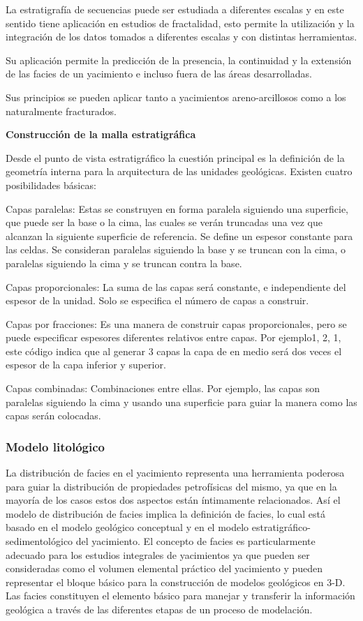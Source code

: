 La estratigraf\'ia de secuencias puede ser estudiada a diferentes escalas y en este sentido tiene aplicaci\'on en estudios de fractalidad, esto permite la utilizaci\'on y la integraci\'on de los datos tomados a diferentes escalas y con distintas herramientas.

Su aplicaci\'on permite la predicci\'on de la presencia, la continuidad y la extensi\'on de las facies de un yacimiento e incluso fuera de las \'areas desarrolladas.

Sus principios se pueden aplicar tanto a yacimientos areno-arcillosos como a los naturalmente fracturados.

\textbf{Construcci\'on de la malla estratigr\'afica}

Desde el punto de vista estratigr\'afico la cuesti\'on principal es la definici\'on de la geometr\'ia interna para la arquitectura de las unidades geol\'ogicas. Existen cuatro posibilidades b\'asicas:

Capas paralelas: Estas se construyen en forma paralela siguiendo una superficie, que puede ser la base o la cima, las cuales se ver\'an truncadas una vez que alcanzan la siguiente superficie de referencia. Se define un espesor constante para las celdas. Se consideran paralelas siguiendo la base y se truncan con la cima, o paralelas siguiendo la cima y se truncan contra la base.

Capas proporcionales: La suma de las capas ser\'a constante, e independiente del espesor de la unidad. Solo se especifica el n\'umero de capas a construir.

Capas por fracciones: Es una manera de construir capas proporcionales, pero se puede especificar espesores diferentes relativos entre capas. Por ejemplo1, 2, 1, este c\'odigo indica que al generar 3 capas la capa de en medio ser\'a dos veces el espesor de la capa inferior y superior.

Capas combinadas: Combinaciones entre ellas. Por ejemplo, las capas son paralelas siguiendo la cima y usando una superficie para guiar la manera como las capas ser\'an colocadas.

\subsubsection{Modelo litol\'ogico}

La distribuci\'on de facies en el yacimiento representa una herramienta poderosa para guiar la distribuci\'on de propiedades petrof\'isicas del mismo, ya que en la mayor\'ia de los casos estos dos aspectos est\'an \'intimamente relacionados. As\'i el modelo de distribuci\'on de facies implica la definici\'on de facies, lo cual est\'a basado en el modelo geol\'ogico conceptual y en el modelo estratigr\'afico-sedimentol\'ogico del yacimiento. El concepto de facies es particularmente adecuado para los estudios integrales de yacimientos ya que pueden ser consideradas como el volumen elemental pr\'actico del yacimiento y pueden representar el bloque b\'asico para la construcci\'on de modelos geol\'ogicos en 3-D. Las facies constituyen el elemento b\'asico para manejar y transferir la informaci\'on geol\'ogica a trav\'es de las diferentes etapas de un proceso de modelaci\'on.


